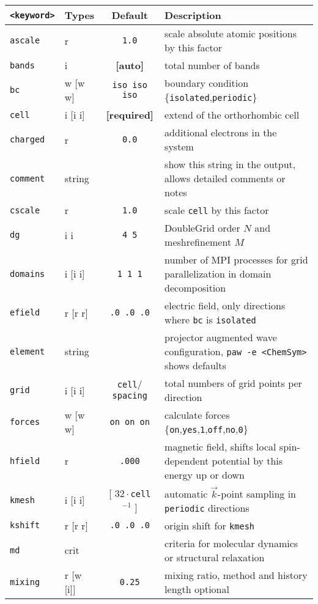 \documentclass[12pt,BCOR8mm,noappendixprefix,nochapterprefix,bibtotoc,idxtotoc,openbib,tablecaptionabove]{scrbook}
\newcommand{\ttt}[1]{\texttt{#1}}
\begin{document}
\begin{sidewaystable*}
\begin{tabular}{ l lcl }
\hline
 \ttt{<keyword>} & Types & Default & Description \\
\hline
 \ttt{ascale  } & r & \ttt{1.0} & scale absolute atomic positions by this factor \\
 \ttt{bands   } & i & \textbf{[auto]} & total number of bands \\
 \ttt{bc      } & w [w w] & \ttt{iso iso iso} & boundary condition \{\ttt{isolated},\ttt{periodic}\} \\
 \ttt{cell    } & i [i i] & \textbf{[required]} & extend of the orthorhombic cell \\
 \ttt{charged } & r & \ttt{0.0} & additional electrons in the system \\
 \ttt{comment } & string & & show this string in the output, allows detailed comments or notes \\
 \ttt{cscale  } & r & \ttt{1.0} & scale \ttt{cell} by this factor \\
 \ttt{dg      } & i i & \ttt{4 5} & DoubleGrid order $N$ and meshrefinement $M$ \\
 \ttt{domains } & i [i i] & \ttt{1 1 1} & number of MPI processes for grid parallelization in domain decomposition \\
 \ttt{efield  } & r [r r] & \ttt{.0 .0 .0} & electric field, only directions where \ttt{bc} is \ttt{isolated} \\
 \ttt{element } & string & & projector augmented wave configuration, \ttt{paw -e <ChemSym>} shows defaults \\
 \ttt{grid    } & i [i i] & \ttt{cell}$/$\ttt{spacing} & total numbers of grid points per direction \\
 \ttt{forces  } & w [w w] & \ttt{on on on} & calculate forces \{\ttt{on},\ttt{yes},\ttt{1},\ttt{off},\ttt{no},\ttt{0}\} \\
 \ttt{hfield  } & r & \ttt{.000} & magnetic field, shifts local spin-dependent potential by this energy up or down \\
 \ttt{kmesh   } & i [i i] & [ $32\cdot$\ttt{cell}$^{-1}$ ] & automatic $\vec k$-point sampling in \ttt{periodic} directions \\
 \ttt{kshift  } & r [r r] & \ttt{.0 .0 .0} & origin shift for \ttt{kmesh} \\
 \ttt{md      } & crit & & criteria for molecular dynamics or structural relaxation \\
 \ttt{mixing  } & r [w [i]] & \ttt{0.25} & mixing ratio, method and history length optional \\
\hline
\end{tabular}
\end{sidewaystable*}
\end{document}

